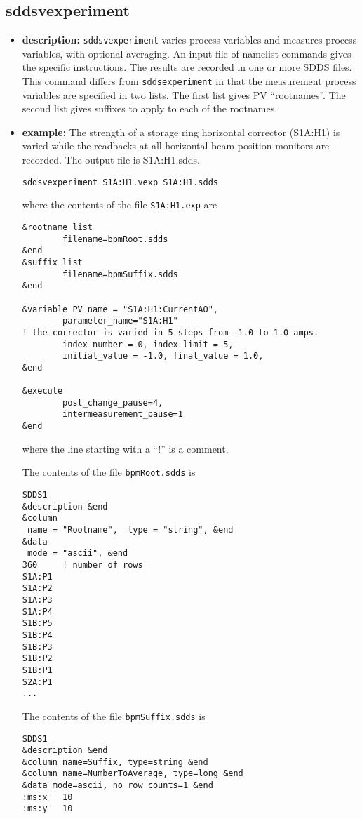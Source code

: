%
%
\begin{latexonly}
\newpage
\end{latexonly}

%
%
\subsection{sddsvexperiment}
\label{sddsvexperiment}

\begin{itemize}
\item {\bf description:}
%
%
\verb+sddsvexperiment+ varies process variables and measures process variables, with optional averaging.
An input file of namelist commands gives the specific instructions.
The results are recorded in one or more SDDS files. This command differs from
\verb+sddsexperiment+ in that the measurement process variables are specified in two lists.  The first
list gives PV ``rootnames''.  The second list gives suffixes to apply to each of 
the rootnames.
\item {\bf example:} 
%
% 
%
The strength of a storage ring horizontal corrector (S1A:H1) is varied while the readbacks at all horizontal beam position
monitors are recorded. The output file is S1A:H1.sdds.
\begin{verbatim}
sddsvexperiment S1A:H1.vexp S1A:H1.sdds
\end{verbatim}

where the contents of the file \verb+S1A:H1.exp+ are
\begin{verbatim}
&rootname_list 
        filename=bpmRoot.sdds
&end
&suffix_list 
        filename=bpmSuffix.sdds
&end

&variable PV_name = "S1A:H1:CurrentAO",
        parameter_name="S1A:H1"
! the corrector is varied in 5 steps from -1.0 to 1.0 amps.
        index_number = 0, index_limit = 5,
        initial_value = -1.0, final_value = 1.0,
&end
        
&execute
        post_change_pause=4,
        intermeasurement_pause=1
&end
\end{verbatim}
where the line starting with a ``!'' is a comment.

The contents of the file \verb+bpmRoot.sdds+ is
\begin{verbatim}
SDDS1
&description &end
&column
 name = "Rootname",  type = "string", &end
&data
 mode = "ascii", &end
360     ! number of rows
S1A:P1
S1A:P2
S1A:P3
S1A:P4
S1B:P5
S1B:P4
S1B:P3
S1B:P2
S1B:P1
S2A:P1  
...
\end{verbatim}
The contents of the file \verb+bpmSuffix.sdds+ is
\begin{verbatim}
SDDS1
&description &end
&column name=Suffix, type=string &end
&column name=NumberToAverage, type=long &end
&data mode=ascii, no_row_counts=1 &end
:ms:x   10
:ms:y   10
\end{verbatim}


\end{itemize}
